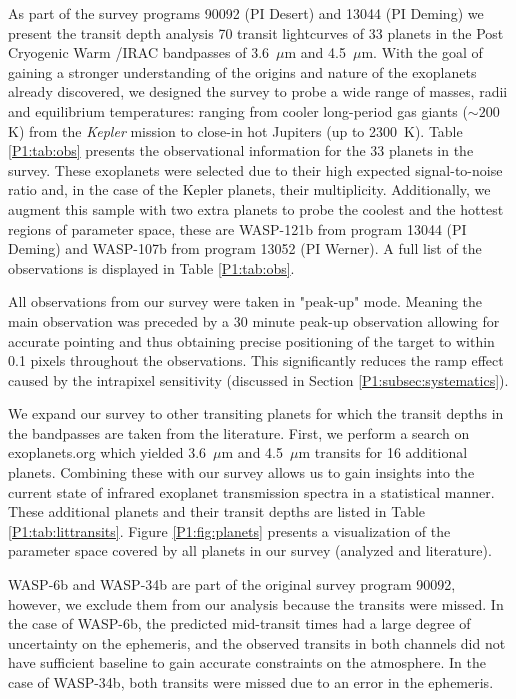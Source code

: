 As part of the survey programs 90092 (PI Desert) and 13044 (PI Deming) we present the transit depth analysis 70 transit lightcurves of 33 planets in the Post Cryogenic Warm \textit{\spitzer}/IRAC bandpasses of 3.6~$\mu$m and 4.5~$\mu$m. With the goal of gaining a stronger understanding of the origins and nature of the exoplanets already discovered, we designed the survey to probe a wide range of masses, radii and equilibrium temperatures: ranging from cooler long-period gas giants ($\sim200$K) from the \textit{Kepler} mission to close-in hot Jupiters (up to 2300~K). Table \ref{P1:tab:obs} presents the observational information for the 33 planets in the survey. These exoplanets were selected due to their high expected signal-to-noise ratio and, in the case of the Kepler planets, their multiplicity. Additionally, we augment this sample with two extra planets to probe the coolest and the hottest regions of parameter space, these are WASP-121b from program 13044 (PI Deming) and WASP-107b from program 13052 (PI Werner). A full list of the observations is displayed in Table \ref{P1:tab:obs}.

All observations from our survey were taken in "peak-up" mode. Meaning the main observation was preceded by a 30 minute peak-up observation allowing for accurate pointing and thus obtaining precise positioning of the target to within 0.1 pixels throughout the observations. This significantly reduces the ramp effect caused by the intrapixel sensitivity (discussed in Section \ref{P1:subsec:systematics}).

We expand our survey to other transiting planets for which the transit depths in the \spitzer bandpasses are taken from the literature. First, we perform a search on exoplanets.org \citep{Wright2011} which yielded 3.6~$\mu$m and 4.5~$\mu$m transits for 16 additional planets. Combining these with our survey allows us to gain insights into the current state of infrared exoplanet transmission spectra in a statistical manner. These additional planets and their transit depths are listed in Table \ref{P1:tab:littransits}. Figure \ref{P1:fig:planets} presents a visualization of the parameter space covered by all planets in our survey (analyzed and literature).

WASP-6b and WASP-34b are part of the original survey program 90092, however, we exclude them from our analysis because the transits were missed. In the case of WASP-6b, the predicted mid-transit times had a large degree of uncertainty on the ephemeris, and the observed transits in both channels did not have sufficient baseline to gain accurate constraints on the atmosphere. In the case of WASP-34b, both transits were missed due to an error in the ephemeris.


